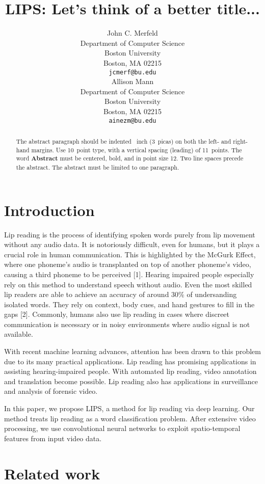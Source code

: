 \documentclass{article}
\title{LIPS: Let's think of a better title...}
\author{%
  John C. Merfeld \\
  Department of Computer Science\\
  Boston University\\
  Boston, MA 02215 \\
  \texttt{jcmerf@bu.edu} \\
	\And
  Allison Mann \\
  Department of Computer Science\\
  Boston University\\
  Boston, MA 02215 \\
  \texttt{ainezm@bu.edu} \\
}
\begin{document}
\maketitle

\begin{abstract}
  The abstract paragraph should be indented ~inch (3~picas) on
  both the left- and right-hand margins. Use 10~point type, with a vertical
  spacing (leading) of 11~points.  The word \textbf{Abstract} must be centered,
  bold, and in point size 12. Two line spaces precede the abstract. The abstract
  must be limited to one paragraph.
\end{abstract}

\section{Introduction}

Lip reading is the process of identifying spoken words purely from lip movement without any audio data. It is notoriously difficult, even for humans, but it plays a crucial role in human communication. This is highlighted by the McGurk Effect, where one phoneme's audio is transplanted on top of another phoneme's video, causing a third phoneme to be perceived [1]. Hearing impaired people especially rely on this method to understand speech without audio. Even the most skilled lip readers are able to achieve an accuracy of around 30\% of undersanding isolated words. They rely on context, body cues, and hand gestures to fill in the gaps [2]. Commonly, humans also use lip reading in cases where discreet communication is necessary or in noisy environments where audio signal is not available.

With recent machine learning advances, attention has been drawn to this problem due to its many practical applications. Lip reading has promising applications in assisting hearing-impaired people. With automated lip reading, video annotation and translation become possible. Lip reading also has applications in surveillance and analysis of forensic video.

In this paper, we propose LIPS, a method for lip reading via deep learning. Our method treats lip reading as a word classification problem. After extensive video processing, we use convolutional neural networks to exploit spatio-temporal features from input video data.


\section{Related work}
\end{document}
